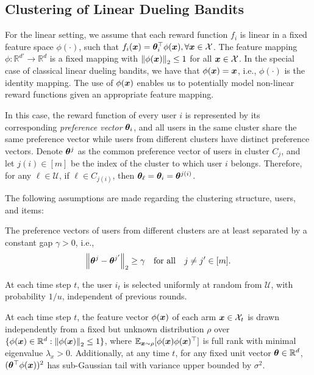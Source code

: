 \subsection{Clustering of Linear Dueling Bandits}
\label{subsec:problem:setting:linear}
For the linear setting, we assume that each reward function \( f_i \) is linear in a fixed feature space \( \phi(\cdot) \), such that \( f_i(\boldsymbol{x}) = \boldsymbol{\theta}_i^{\top} \phi(\boldsymbol{x}),\forall \boldsymbol{x}\in\mathcal{X} \). 
The feature mapping \( \phi: \mathbb{R}^{d'} \to \mathbb{R}^d \) is a fixed mapping with \( \left\| \phi(\boldsymbol{x}) \right\|_2 \leq 1 \) for all \( \boldsymbol{x} \in \mathcal{X} \). In the special case of classical linear dueling bandits, we have that \( \phi(\boldsymbol{x}) = \boldsymbol{x} \), i.e., $\phi(\cdot)$ is the identity mapping. The use of \( \phi(\boldsymbol{x}) \) enables us to potentially model non-linear reward functions given an appropriate feature mapping.

In this case, the reward function of every user $i$ is represented by its corresponding \emph{preference vector} $\boldsymbol{\theta}_i$, and all users in the same cluster share the same preference vector while users from different clusters have distinct preference vectors. 
Denote \( \boldsymbol{\theta}^j \) as the common preference vector of users in cluster \( C_j \), and let \( j(i) \in [m] \) be the index of the cluster to which user \( i \) belongs. Therefore, for any \( \ell \in \mathcal{U} \), if \( \ell \in C_{j(i)} \), then \( \boldsymbol{\theta}_\ell = \boldsymbol{\theta}_i = \boldsymbol{\theta}^{j(i)} \).

The following assumptions are made regarding the clustering structure, users, and items:
\begin{assumption}
\label{assumption1}
The preference vectors of users from different clusters are at least separated by a constant gap \( \gamma > 0 \), i.e.,
\[
\left\| \boldsymbol{\theta}^{j} - \boldsymbol{\theta}^{j'}  \right\|_2 \geq \gamma \quad \text{for all} \quad j \neq j' \in [m].
\]
\end{assumption}

\begin{assumption}
\label{assumption2}
At each time step \( t \), the user \( i_t \) is selected uniformly at random from \( \mathcal{U} \), with probability \( 1/u \), independent of previous rounds.
\end{assumption}

\begin{assumption}
\label{assumption3}
At each time step $t$, the feature vector $\phi(\boldsymbol{x})$ of each arm $\boldsymbol{x}\in \mathcal{X}_t$ is drawn independently from a fixed but unknown distribution $\rho$ over $\{\phi(\boldsymbol{x})\in\mathbb{R}^d:\left\| \phi(\boldsymbol{x}) \right\|_2\leq1\}$, where 
$\mathbb{E}_{\boldsymbol{x}\sim \rho}[\phi(\boldsymbol{x}) \phi(\boldsymbol{x})^{\top}]$ 
is full rank with minimal eigenvalue $\lambda_x > 0$. Additionally, at any time $t$, for any fixed unit vector $\boldsymbol{\theta} \in \mathbb{R}^d$, $(\boldsymbol{\theta}^{\top}\phi(\boldsymbol{x}))^2$ has sub-Gaussian tail with variance upper bounded by $\sigma^2$.
\end{assumption}

